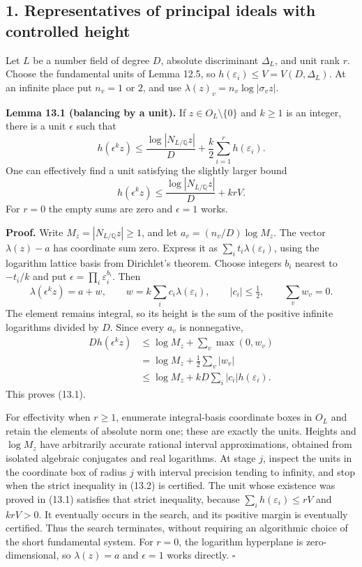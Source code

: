 \documentclass[
  11pt,
  a4paper,
]{article}
\begin{document}
\subsection{1. Representatives of principal ideals with controlled
height}\label{representatives-of-principal-ideals-with-controlled-height}

Let \(L\) be a number field of degree \(D\), absolute discriminant
\(\Delta_L\), and unit rank \(r\). Choose the fundamental units of Lemma
12.5, so \(h(\varepsilon_i)\le V=V(D,\Delta_L)\). At an infinite place
put \(n_v=1\) or \(2\), and use \(\lambda(z)_v=n_v\log|\sigma_vz|\).

\textbf{Lemma 13.1 (balancing by a unit).} If \(z\in O_L\setminus\{0\}\)
and \(k\ge1\) is an integer, there is a unit \(\epsilon\) such that \[
h(\epsilon^kz)\le
\frac{\log|N_{L/\mathbb Q}z|}{D}
+\frac{k}{2}\sum_{i=1}^r h(\varepsilon_i).
\tag{13.1}
\] One can effectively find a unit satisfying the slightly larger bound
\[
h(\epsilon^kz)\le
\frac{\log|N_{L/\mathbb Q}z|}{D}+krV.
\tag{13.2}
\] For \(r=0\) the empty sums are zero and \(\epsilon=1\) works.

\textbf{Proof.} Write \(M_z=|N_{L/\mathbb Q}z|\ge1\), and let
\(a_v=(n_v/D)\log M_z\). The vector \(\lambda(z)-a\) has coordinate sum
zero. Express it as \(\sum_i t_i\lambda(\varepsilon_i)\), using the
logarithm lattice basis from Dirichlet's theorem. Choose integers
\(b_i\) nearest to \(-t_i/k\) and put
\(\epsilon=\prod_i\varepsilon_i^{b_i}\). Then \[
\lambda(\epsilon^kz)=a+w,\qquad
w=k\sum_i c_i\lambda(\varepsilon_i),\qquad |c_i|\le\tfrac12,
\qquad \sum_vw_v=0.
\tag{13.3}
\] The element remains integral, so its height is the sum of the
positive infinite logarithms divided by \(D\). Since every \(a_v\) is
nonnegative, \[
\begin{aligned}
D h(\epsilon^kz)
&\le\log M_z+\sum_v\max(0,w_v)\\
&=\log M_z+\tfrac12\sum_v|w_v|\\
&\le\log M_z+kD\sum_i|c_i|h(\varepsilon_i).
\end{aligned}
\] This proves (13.1).

For effectivity when \(r\ge1\), enumerate integral-basis coordinate
boxes in \(O_L\) and retain the elements of absolute norm one; these are
exactly the units. Heights and \(\log M_z\) have arbitrarily accurate
rational interval approximations, obtained from isolated algebraic
conjugates and real logarithms. At stage \(j\), inspect the units in the
coordinate box of radius \(j\) with interval precision tending to
infinity, and stop when the strict inequality in (13.2) is certified.
The unit whose existence was proved in (13.1) satisfies that strict
inequality, because \(\sum_i h(\varepsilon_i)\le rV\) and \(krV>0\). It
eventually occurs in the search, and its positive margin is eventually
certified. Thus the search terminates, without requiring an algorithmic
choice of the short fundamental system. For \(r=0\), the logarithm
hyperplane is zero-dimensional, so \(\lambda(z)=a\) and \(\epsilon=1\)
works directly. \(\square\)
\end{document}
